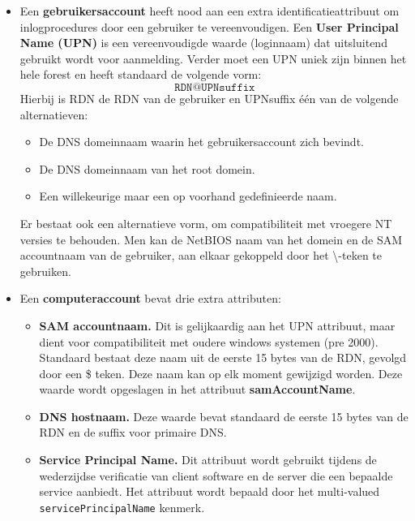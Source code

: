 \begin{enumerate}
{			\begin{itemize}
				\item Een \textbf{gebruikersaccount} heeft nood aan een extra identificatieattribuut om inlogprocedures door een gebruiker te vereenvoudigen. Een \textbf{User Principal Name (UPN)} is een vereenvoudigde waarde (loginnaam) dat uitsluitend gebruikt wordt voor aanmelding. Verder moet een UPN uniek zijn binnen het hele forest en heeft standaard de volgende vorm:
				$$\texttt{RDN@UPNsuffix}$$
				Hierbij is RDN de RDN van de gebruiker en UPNsuffix één van de volgende alternatieven:
				\begin{itemize}
					\item De DNS domeinnaam waarin het gebruikersaccount zich bevindt.
					\item De DNS domeinnaam van het root domein.
					\item Een willekeurige maar een op voorhand gedefinieerde naam.
				\end{itemize}

				Er bestaat ook een alternatieve vorm, om compatibiliteit met vroegere NT versies te behouden. Men kan de NetBIOS naam van het domein en de SAM accountnaam van de gebruiker, aan elkaar gekoppeld door het \textbackslash-teken te gebruiken.  
				
				\item Een \textbf{computeraccount} bevat drie extra attributen:
				\begin{itemize}
					\item \textbf{SAM accountnaam.} Dit is gelijkaardig aan het UPN attribuut, maar dient voor compatibiliteit met oudere windows systemen (pre 2000). Standaard bestaat deze naam uit de eerste 15 bytes van de RDN, gevolgd door een \$ teken. Deze naam kan op elk moment gewijzigd worden. Deze waarde wordt opgeslagen in het attribuut \textbf{samAccountName}.
					\item \textbf{DNS hostnaam.} Deze waarde bevat standaard de eerste 15 bytes van de RDN en de suffix voor primaire DNS.
					\item \textbf{Service Principal Name.} Dit attribuut wordt gebruikt tijdens de wederzijdse verificatie van client software en de server die een bepaalde service aanbiedt. Het attribuut wordt bepaald door het multi-valued \texttt{servicePrincipalName} kenmerk.
				\end{itemize}
			\end{itemize}
		}
		
		 { 		
			
}
\end{enumerate}
